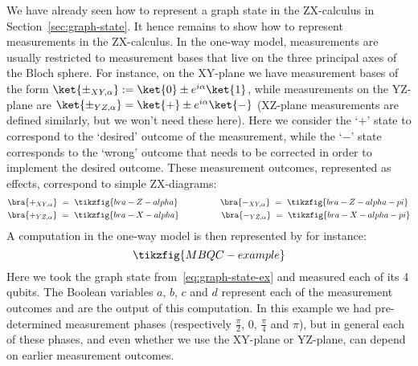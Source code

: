 \documentclass[a4paper,onecolumn,superscriptaddress,11pt,%
				unpublished,%
				allowfontchageintitle,%
				]{quantumarticle}
\begin{document}
We have already seen how to represent a graph state in the ZX-calculus in Section~\ref{sec:graph-state}. It hence remains to show how to represent measurements in the ZX-calculus. In the one-way model, measurements are usually restricted to measurement bases that live on the three principal axes of the Bloch sphere. 
For instance, on the XY-plane we have measurement bases of the form $\ket{\pm_{XY,\alpha}} := \ket{0} \pm e^{i\alpha}\ket{1}$, 
while measurements on the YZ-plane are $\ket{\pm_{YZ,\alpha}} = \ket{+} \pm e^{i\alpha}\ket{-}$ (XZ-plane measurements are defined similarly, but we won't need these here). 
Here we consider the `$+$' state to correspond to the `desired' outcome of the measurement, 
while the `$-$' state corresponds to the `wrong' outcome that needs to be corrected in order to implement the desired outcome.
These measurement outcomes, represented as effects, correspond to simple ZX-diagrams:
\begin{align*}
	&\bra{+_{XY,\alpha}} \ = \ \tikzfig{bra-Z-alpha} \qquad \qquad\quad \bra{-_{XY,\alpha}} \ = \ \tikzfig{bra-Z-alpha-pi} \\
	&\bra{+_{YZ,\alpha}} \ = \ \tikzfig{bra-X-alpha} \qquad \qquad\quad \bra{-_{YZ,\alpha}} \ = \ \tikzfig{bra-X-alpha-pi}
\end{align*}
A computation in the one-way model is then represented by for instance:
\begin{equation}
	\tikzfig{MBQC-example}
\end{equation}
Here we took the graph state from~\eqref{eq:graph-state-ex} and measured each of its 4 qubits. The Boolean variables $a$, $b$, $c$ and $d$ represent each of the measurement outcomes and are the output of this computation. In this example we had pre-determined measurement phases (respectively $\frac\pi2$, $0$, $\frac\pi4$ and $\pi$), but in general each of these phases, and even whether we use the XY-plane or YZ-plane, can depend on earlier measurement outcomes.
\end{document}
